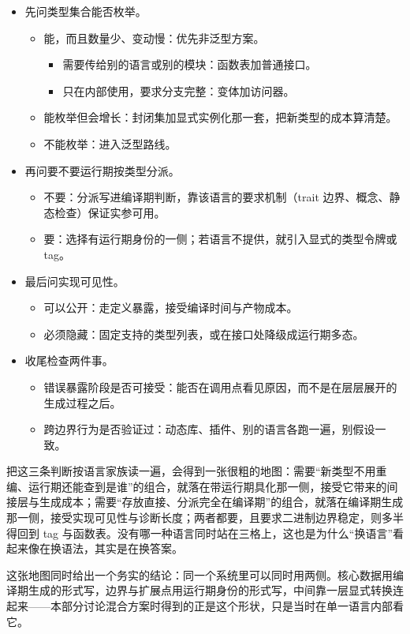 \documentclass[12pt,a4paper,fontset=fandol]{ctexbook}
\begin{document}
\begin{itemize}
\item 先问类型集合能否枚举。
  \begin{itemize}
  \item 能，而且数量少、变动慢：优先非泛型方案。
    \begin{itemize}
    \item 需要传给别的语言或别的模块：函数表加普通接口。
    \item 只在内部使用，要求分支完整：变体加访问器。
    \end{itemize}
  \item 能枚举但会增长：封闭集加显式实例化那一套，把新类型的成本算清楚。
  \item 不能枚举：进入泛型路线。
  \end{itemize}
\item 再问要不要运行期按类型分派。
  \begin{itemize}
  \item 不要：分派写进编译期判断，靠该语言的要求机制（trait 边界、概念、静态检查）保证实参可用。
  \item 要：选择有运行期身份的一侧；若语言不提供，就引入显式的类型令牌或 tag。
  \end{itemize}
\item 最后问实现可见性。
  \begin{itemize}
  \item 可以公开：走定义暴露，接受编译时间与产物成本。
  \item 必须隐藏：固定支持的类型列表，或在接口处降级成运行期多态。
  \end{itemize}
\item 收尾检查两件事。
  \begin{itemize}
  \item 错误暴露阶段是否可接受：能否在调用点看见原因，而不是在层层展开的生成过程之后。
  \item 跨边界行为是否验证过：动态库、插件、别的语言各跑一遍，别假设一致。
  \end{itemize}
\end{itemize}

把这三条判断按语言家族读一遍，会得到一张很粗的地图：需要“新类型不用重编、运行期还能查到是谁”的组合，就落在带运行期具化那一侧，接受它带来的间接层与生成成本；需要“存放直接、分派完全在编译期”的组合，就落在编译期生成那一侧，接受实现可见性与诊断长度；两者都要，且要求二进制边界稳定，则多半得回到 tag 与函数表。没有哪一种语言同时站在三格上，这也是为什么“换语言”看起来像在换语法，其实是在换答案。

这张地图同时给出一个务实的结论：同一个系统里可以同时用两侧。核心数据用编译期生成的形式写，边界与扩展点用运行期身份的形式写，中间靠一层显式转换连起来——本部分讨论混合方案时得到的正是这个形状，只是当时在单一语言内部看它。
\end{document}

